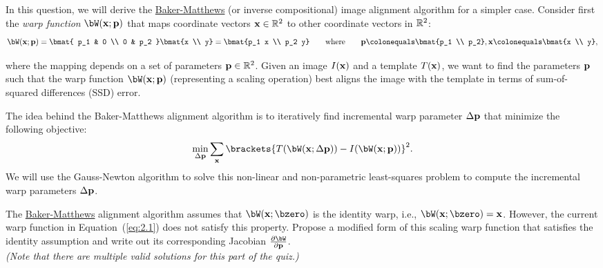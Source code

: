 \begin{problem}
  In this question, we will derive the \underline{Baker-Matthews}
  (or inverse compositional) image alignment algorithm for a simpler case.
  Consider first the \emph{warp function} $\bW(\bx; \bp)$ that maps
  coordinate vectors $\mathbf{x} \in \mathbb{R}^2$ to other coordinate vectors in $\mathbb{R}^2$:
  \begin{equation}
    \bW(\bx; \bp) =
      \bmat{ p_1 & 0 \\ 0 & p_2 }
      \bmat{x \\ y}
      = \bmat{p_1 x \\ p_2 y}
      \qquad \text{where} \qquad
      \bp \colonequals \bmat{p_1 \\ p_2},
      \bx \colonequals \bmat{x \\ y},
    \label{eq:2.1}
  \end{equation}

  where the mapping depends on a set of parameters $\mathbf{p} \in \mathbb{R}^2$.
  Given an image $I(\mathbf{x})$ and a template $T(\mathbf{x})$, we want to find the
  parameters $\mathbf{p}$ such that the warp function $\bW(\bx; \bp)$
  (representing a scaling operation) best aligns the image with the
  template in terms of sum-of-squared differences (SSD) error.

  The idea behind the Baker-Matthews alignment algorithm is to
  iteratively find incremental warp parameter $\Delta \mathbf{p}$ that
  minimize the following objective:
  \begin{equation}
    \min_{\Delta \bp} \sum_\bx \brackets{T(\bW(\bx; \Delta \bp)) - I(\bW(\bx; \bp))}^2.
    \label{eq:2.2}
  \end{equation}
  We will use the Gauss-Newton algorithm to solve this non-linear and
  non-parametric least-squares problem to compute the incremental warp
  parameters $\Delta \mathbf{p}$.

  \begin{enumroman}
    \item The \underline{Baker-Matthews} alignment algorithm assumes that
      $\bW(\bx; \bzero)$ is the identity warp, i.e., $\bW(\bx; \bzero) = \bx$.
      However, the current warp function in Equation~(\ref{eq:2.1}) does not
      satisfy this property. Propose a modified form of this scaling warp function
      that satisfies the identity assumption and write out its corresponding
      Jacobian $\frac{\partial \bW}{\partial \bp}$. \\
      \emph{(Note that there are multiple valid solutions for this part of the quiz.)}


\end{enumroman}
\end{problem}
